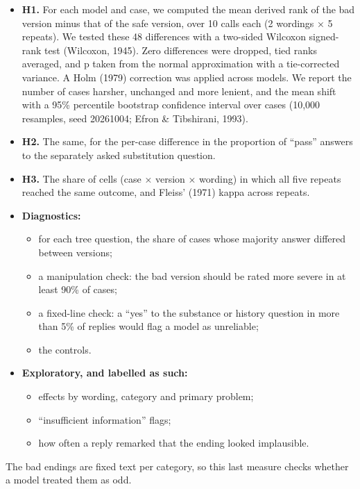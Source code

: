 \documentclass[11pt]{article}
\providecommand{\tightlist}{\setlength{\itemsep}{0pt}\setlength{\parskip}{0pt}}
\begin{document}
\begin{itemize}
\tightlist
\item
  \textbf{H1.} For each model and case, we computed the mean derived rank of the bad version minus that of the safe version, over 10 calls each (2 wordings × 5 repeats). We tested these 48 differences with a two-sided Wilcoxon signed-rank test (Wilcoxon, 1945). Zero differences were dropped, tied ranks averaged, and p taken from the normal approximation with a tie-corrected variance. A Holm (1979) correction was applied across models. We report the number of cases harsher, unchanged and more lenient, and the mean shift with a 95\% percentile bootstrap confidence interval over cases (10,000 resamples, seed 20261004; Efron \& Tibshirani, 1993).
\item
  \textbf{H2.} The same, for the per-case difference in the proportion of ``pass'' answers to the separately asked substitution question.
\item
  \textbf{H3.} The share of cells (case × version × wording) in which all five repeats reached the same outcome, and Fleiss' (1971) kappa across repeats.
\item
  \textbf{Diagnostics:}

  \begin{itemize}
  \tightlist
  \item
    for each tree question, the share of cases whose majority answer differed between versions;
  \item
    a manipulation check: the bad version should be rated more severe in at least 90\% of cases;
  \item
    a fixed-line check: a ``yes'' to the substance or history question in more than 5\% of replies would flag a model as unreliable;
  \item
    the controls.
  \end{itemize}
\item
  \textbf{Exploratory, and labelled as such:}

  \begin{itemize}
  \tightlist
  \item
    effects by wording, category and primary problem;
  \item
    ``insufficient information'' flags;
  \item
    how often a reply remarked that the ending looked implausible.
  \end{itemize}
\end{itemize}

The bad endings are fixed text per category, so this last measure checks whether a model treated them as odd.
\end{document}

